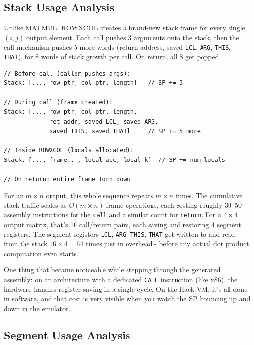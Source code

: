 \documentclass[12pt,a4paper]{article}
\begin{document}
\subsection{Stack Usage Analysis}

Unlike MATMUL, ROWXCOL creates a brand-new stack frame for every single $(i, j)$ output element. Each call pushes 3 arguments onto the stack, then the call mechanism pushes 5 more words (return address, saved \texttt{LCL}, \texttt{ARG}, \texttt{THIS}, \texttt{THAT}), for 8 words of stack growth per call. On return, all 8 get popped.

\begin{lstlisting}[style=pseudo, caption={Stack state during one ROWXCOL call}]
// Before call (caller pushes args):
Stack: [..., row_ptr, col_ptr, length]   // SP += 3

// During call (frame created):
Stack: [..., row_ptr, col_ptr, length,
             ret_addr, saved_LCL, saved_ARG,
             saved_THIS, saved_THAT]     // SP += 5 more

// Inside ROWXCOL (locals allocated):
Stack: [..., frame..., local_acc, local_k]  // SP += num_locals

// On return: entire frame torn down
\end{lstlisting}

For an $m \times n$ output, this whole sequence repeats $m \times n$ times. The cumulative stack traffic scales as $O(m \times n)$ frame operations, each costing roughly 30--50 assembly instructions for the \texttt{call} and a similar count for \texttt{return}. For a $4 \times 4$ output matrix, that's 16 call/return pairs, each saving and restoring 4 segment registers. The segment registers \texttt{LCL}, \texttt{ARG}, \texttt{THIS}, \texttt{THAT} get written to and read from the stack $16 \times 4 = 64$ times just in overhead - before any actual dot product computation even starts.

One thing that became noticeable while stepping through the generated assembly: on an architecture with a dedicated \texttt{CALL} instruction (like x86), the hardware handles register saving in a single cycle. On the Hack VM, it's all done in software, and that cost is very visible when you watch the SP bouncing up and down in the emulator.

\subsection{Segment Usage Analysis}
\end{document}
